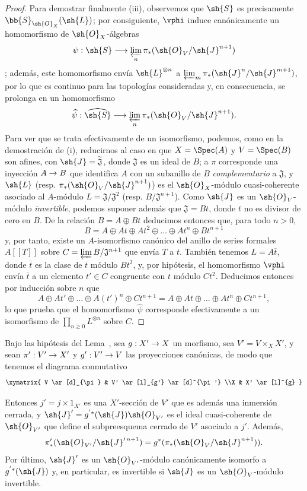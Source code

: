 \documentclass[oneside,10pt]{amsart}
\makeatletter
\renewcommand{\geq}{\geqslant}
\newcommand{\ega@arrow}[2]{\mathchoice{#1}{#2}{#2}{#2}}
\renewcommand{\to}{\ega@arrow{\longrightarrow}{\rightarrow}}
\newcommand{\oldpage}[2][]{\marginnote{\normalfont\footnotesize\textbf{#1}~|~#2}\ignorespaces}
\let\EGAOriginalLabel\label
\renewcommand{\label}[1]{\phantomsection\EGAOriginalLabel{#1}}
\makeatother
\begin{document}
\begin{proof}
Para demostrar finalmente (iii), observemos que $\sh{S}$ es precisamente $\bb{S}_{\sh{O}_X}(\sh{L})$;
por consiguiente, $\vphi$ induce canónicamente un homomorfismo de $\sh{O}_X$-álgebras
\[
  \psi:\sh{S}\longrightarrow
  \varprojlim_n\pi_*(\sh{O}_V/\sh{J}^{n+1})
\]
;
además, este homomorfismo envía $\sh{L}^{\otimes n}$ a $\varprojlim_m\pi_*(\sh{J}^n/\sh{J}^{m+1})$, por lo que es continuo para las topologías consideradas y, en consecuencia, se prolonga en un homomorfismo
\[
  \widehat{\psi}:\widehat{\sh{S}}\longrightarrow
  \varprojlim_n\pi_*(\sh{O}_V/\sh{J}^{n+1}).
\]
Para ver que se trata efectivamente de un isomorfismo, podemos, como en la demostración de (i), reducirnos al caso en que $X=\Spec(A)$ y $V=\Spec(B)$ son afines, con $\sh{J}=\widetilde{\mathfrak{J}}$, donde $\mathfrak{J}$ es un ideal de $B$;
a $\pi$ corresponde una inyección $A\to B$ que identifica $A$ con un subanillo de $B$ \emph{complementario} a $\mathfrak{J}$, y $\sh{L}$ (resp. $\pi_*(\sh{O}_V/\sh{J}^{n+1})$) es el $\sh{O}_X$-módulo cuasi-coherente asociado al $A$-módulo $L=\mathfrak{J}/\mathfrak{J}^2$ (resp. $B/\mathfrak{J}^{n+1}$).
Como $\sh{J}$ es un $\sh{O}_V$-módulo \emph{invertible}, podemos suponer además que $\mathfrak{J}=Bt$, donde $t$ no es divisor de cero en $B$.
De la relación $B=A\oplus Bt$ deducimos entonces que, para todo $n>0$,
\[
  B=A\oplus At\oplus At^2\oplus\ldots\oplus At^n\oplus Bt^{n+1}
\]
y, por tanto, existe un $A$-isomorfismo canónico del anillo de series formales $A[[T]]$ sobre $C=\varprojlim B/\mathfrak{J}^{n+1}$ que envía $T$ a $t$.
También tenemos $L=A\overline{t}$, donde $\overline{t}$ es la clase de $t$ módulo $Bt^2$, y, por hipótesis, el homomorfismo $\vphi$ envía $\overline{t}$ a un elemento $t'\in C$ congruente con $t$ módulo $Ct^2$.
Deducimos entonces por inducción sobre $n$ que
\[
  A\oplus At'\oplus\ldots\oplus A(t')^n\oplus Ct^{n+1}
  =A\oplus At\oplus\ldots\oplus At^n\oplus Ct^{n+1},
\]
lo que prueba que el homomorfismo $\widehat{\psi}$ corresponde efectivamente a un isomorfismo de $\prod_{n\geq0}L^{\otimes n}$ sobre $C$.
\end{proof}

\begin{lemma}[8.10.2]
\label{II.8.10.2}
Bajo las hipótesis del Lema~, sea $g:X'\to X$ un morfismo,
\oldpage[II]{186}
sea $V'=V\times_X X'$, y sean $\pi':V'\to X'$ y $g':V'\to V$ las proyecciones canónicas, de modo que tenemos el diagrama conmutativo
\[
  \xymatrix{
    V
      \ar[d]_{\pi}
  & V'
      \ar[l]_{g'}
      \ar[d]^{\pi'}
  \\X
  & X'
      \ar[l]^{g}
  }
\]

Entonces $j'=j\times1_{X'}$ es una $X'$-sección de $V'$ que es además una inmersión cerrada, y $\sh{J}'=g^{'*}(\sh{J})\sh{O}_{V'}$ es el ideal cuasi-coherente de $\sh{O}_{V'}$ que define el subpreesquema cerrado de $V'$ asociado a $j'$.
Además,
\[
  \pi'_*(\sh{O}_{V'}/\sh{J}'^{\,n+1})
  =g^*(\pi_*(\sh{O}_V/\sh{J}^{n+1})).
\]
Por último, $\sh{J}'$ es un $\sh{O}_{V'}$-módulo canónicamente isomorfo a $g^{'*}(\sh{J})$ y, en particular, es invertible si $\sh{J}$ es un $\sh{O}_V$-módulo invertible.
\end{lemma}
\end{document}
